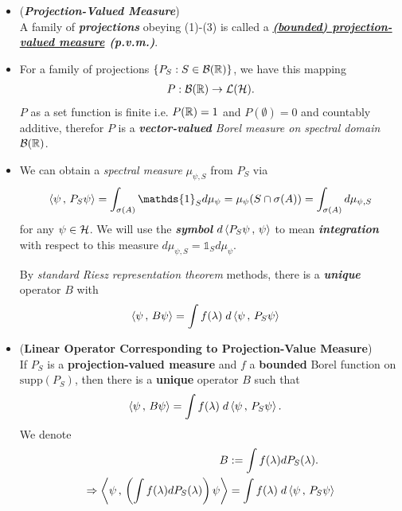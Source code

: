 \documentclass[11pt]{article}
\begin{document}
\begin{itemize}
\item \begin{definition} (\textbf{\emph{Projection-Valued Measure}})\\
A family of \textbf{\emph{projections}} obeying (1)-(3) is called a \emph{\textbf{\underline{(bounded) projection-valued measure} (p.v.m.)}}. 
\end{definition}

\item \begin{remark}
For a family of projections $\left\{P_{S}: S \in {\mathcal B}({\mathbb R})\right\}$, we have this mapping 
\begin{align*}
P: {\mathcal B}({\mathbb R}) \to {\mathcal L}({\mathcal H}).
\end{align*} $P$ as a set function is finite i.e. $P({\mathbb R})= 1$ and $P(\emptyset) = 0$ and countably additive, therefor $P$ is a \emph{\textbf{vector-valued} Borel measure on spectral domain} ${\mathcal B}({\mathbb R})$.
\end{remark}

\item \begin{remark}
We can obtain a \emph{spectral measure} $\mu_{\psi, S}$ from $P_{S}$ via
\begin{align*}
\inn{\psi}{P_S \psi} = \int_{\sigma(A)} \mathds{1}_{S}d\mu_{\psi} = \mu_{\psi}(S \cap \sigma(A)) =\int_{\sigma(A)} d\mu_{\psi, S}
\end{align*} for any $\psi \in {\mathcal H}$. We will use the \emph{\textbf{symbol}} $d\left\langle P_S \psi\,,\, \psi \right\rangle$ to mean \emph{\textbf{integration}} with respect to this measure $d\mu_{\psi, S}=  \mathds{1}_{S}d\mu_{\psi}$. 

By \emph{standard Riesz representation theorem} methods, there is a \emph{\textbf{unique}} operator $Β$ with
\begin{align*}
\left\langle \psi\,,\, B\psi \right\rangle &= \int  f(\lambda) \;d\left\langle \psi\,,\, P_S \psi \right\rangle
\end{align*} 
\end{remark}

\item \begin{proposition} (\textbf{Linear Operator Corresponding to Projection-Value Measure}) \citep{reed1980methods}\\
If $P_{S}$ is a \textbf{projection-valued measure} and $f$ a \textbf{bounded} Borel function on $\text{supp}(P_{S})$, then there is a \textbf{unique} operator $B$ such that
\begin{align*}
\left\langle \psi\,,\, B\psi \right\rangle &= \int f(\lambda) \;d\left\langle \psi\,,\, P_S \psi \right\rangle.
\end{align*} We denote 
\begin{align*}
B &:= \int  f(\lambda) dP_{S}(\lambda). \\
\Rightarrow \left\langle \psi\,,\, \left(\int  f(\lambda) dP_{S}(\lambda)\right)\psi \right\rangle &=  \int f(\lambda) \;d\left\langle \psi\,,\, P_S \psi \right\rangle
\end{align*}
\end{proposition}


\end{itemize}
\end{document}
